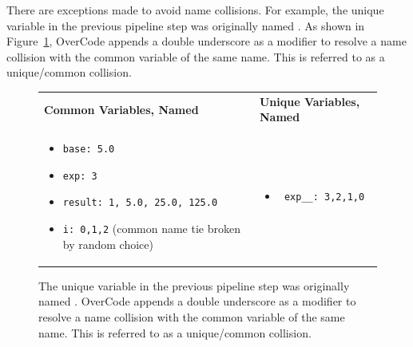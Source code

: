 There are exceptions made to avoid name collisions. For example, the unique variable in the previous pipeline step was originally named . As shown in Figure~\ref{fig:uniqcomm}, OverCode appends a double underscore as a modifier to resolve a name collision with the common variable of the same name. This is referred to as a unique/common collision.
\begin{figure}
\begin{tabular}{ll}
{\bf Common Variables, Named} & {\bf Unique Variables, Named} \\
\begin{minipage}{0.5\linewidth}
\begin{itemize}
\item \texttt{base: 5.0} 
\item \texttt{exp: 3} 
\item \texttt{result: 1, 5.0, 25.0, 125.0}
\item \texttt{i: 0,1,2} (common name tie broken by random choice)
\end{itemize}
\end{minipage}
&
\begin{minipage}{0.5\linewidth}
\begin{itemize}
\item \begin{verbatim} exp__: 3,2,1,0 \end{verbatim}
\end{itemize}
\end{minipage}

\end{tabular}
\caption{The unique variable in the previous pipeline step was originally named . OverCode appends a double underscore as a modifier to resolve a name collision with the common variable of the same name. This is referred to as a unique/common collision.}
\label{fig:uniqcomm}
\end{figure}

